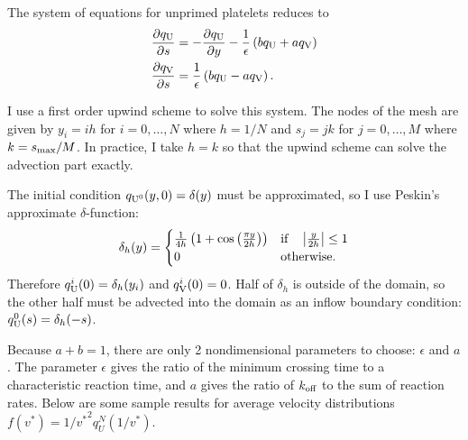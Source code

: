 \documentclass{article}
\newcommand{\tn}{\textnormal}
\newcommand{\dd}{d}
\newcommand{\Der}[2]{\frac{\dd #1}{\dd #2}}
\newcommand{\Pder}[2]{\frac{\partial #1}{\partial #2}}
\begin{document}
The system of equations for unprimed platelets reduces to
\begin{align}
  \label{eq:unprimed-1}
  \Pder{q_\tn{U}}{s} &= -\Pder{q_\tn{U}}{y} - \frac{1}{\epsilon}
                       \left(b q_\tn{U} + a q_\tn{V}\right) \\
  \label{eq:unprimed-2}
  \Pder{q_\tn{V}}{s} &= \frac{1}{\epsilon} \left(b q_\tn{U} - a
                       q_\tn{V}\right).
\end{align}

I use a first order upwind scheme to solve this system. The nodes of
the mesh are given by $y_i = ih$ for $i = 0, \hdots, N$ where
$h = 1/N$ and $s_j = jk$ for $j = 0, \hdots, M$ where $k =
s_\tn{max}/M$. In practice, I take $h = k$ so that the upwind scheme
can solve the advection part exactly.

The initial condition $q_{\tn{U}^0}(y, 0) = \delta(y)$ must be
approximated, so I use Peskin's approximate $\delta$-function:
\begin{equation}
  \label{eq:delta-h}
  \delta_h(y) =
  \begin{cases}
    \frac{1}{4h} \left( 1 + \cos\left(\frac{\pi y}{2h}\right) \right)
    & \tn{if} \quad \left|\frac{y}{2h}\right| \le 1 \\
    0 & \tn{otherwise.}
  \end{cases}
\end{equation}
Therefore $q_\tn{U}^i(0) = \delta_h(y_i)$ and $q_\tn{V}^i(0) =
0$. Half of $\delta_h$ is outside of the domain, so the other half
must be advected into the domain as an inflow boundary condition:
$q_\tn{U}^0(s) = \delta_h(-s)$.

Because $a + b = 1$, there are only 2 nondimensional parameters to
choose: $\epsilon$ and $a$. The parameter $\epsilon$ gives the ratio
of the minimum crossing time to a characteristic reaction time, and
$a$ gives the ratio of $k_\tn{off}$ to the sum of reaction
rates. Below are some sample results for average velocity
distributions $f(v^*) = 1/{v^*}^2 q_U^N(1/v^*)$.
\end{document}
